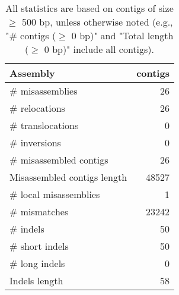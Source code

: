 \documentclass[12pt,a4paper]{article}
\begin{document}
\begin{table}[ht]
\begin{center}
\caption{All statistics are based on contigs of size $\geq$ 500 bp, unless otherwise noted (e.g., "\# contigs ($\geq$ 0 bp)" and "Total length ($\geq$ 0 bp)" include all contigs).}
\begin{tabular}{|l*{1}{|r}|}
\hline
Assembly & contigs \\ \hline
\# misassemblies & 26 \\ \hline
\hspace{5mm}\# relocations & 26 \\ \hline
\hspace{5mm}\# translocations & 0 \\ \hline
\hspace{5mm}\# inversions & 0 \\ \hline
\# misassembled contigs & 26 \\ \hline
Misassembled contigs length & 48527 \\ \hline
\# local misassemblies & 1 \\ \hline
\# mismatches & 23242 \\ \hline
\# indels & 50 \\ \hline
\hspace{5mm}\# short indels & 50 \\ \hline
\hspace{5mm}\# long indels & 0 \\ \hline
Indels length & 58 \\ \hline
\end{tabular}
\end{center}
\end{table}
\end{document}
